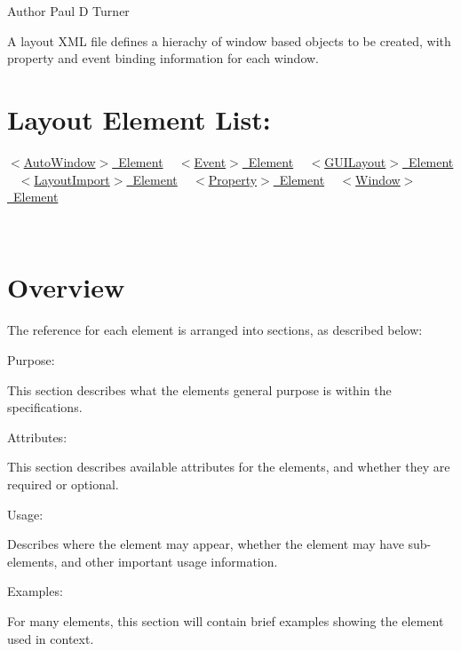 \begin{DoxyAuthor}{Author}
Paul D Turner
\end{DoxyAuthor}
A layout X\+ML file defines a hierachy of window based objects to be created, with property and event binding information for each window.\hypertarget{xml_layout_xml_layout_contents}{}\section{Layout Element List\+:}\label{xml_layout_xml_layout_contents}
\mbox{\hyperlink{xml_layout_xml_layout_autowindow}{$<$\+Auto\+Window$>$ Element}} ~\newline
 \mbox{\hyperlink{xml_layout_xml_layout_event}{$<$\+Event$>$ Element}} ~\newline
 \mbox{\hyperlink{xml_layout_xml_layout_guilayout}{$<$\+G\+U\+I\+Layout$>$ Element}} ~\newline
 \mbox{\hyperlink{xml_layout_xml_layout_layoutimport}{$<$\+Layout\+Import$>$ Element}} ~\newline
 \mbox{\hyperlink{xml_layout_xml_layout_property}{$<$\+Property$>$ Element}} ~\newline
 \mbox{\hyperlink{xml_layout_xml_layout_window}{$<$\+Window$>$ Element}} ~\newline


~\newline
 \hypertarget{xml_layout_xml_layout_overview}{}\section{Overview}\label{xml_layout_xml_layout_overview}
The reference for each element is arranged into sections, as described below\+:
\begin{DoxyItemize}
\item Purpose\+:
\begin{DoxyItemize}
\item This section describes what the elements general purpose is within the specifications.
\end{DoxyItemize}
\item Attributes\+:
\begin{DoxyItemize}
\item This section describes available attributes for the elements, and whether they are required or optional.
\end{DoxyItemize}
\item Usage\+:
\begin{DoxyItemize}
\item Describes where the element may appear, whether the element may have sub-\/elements, and other important usage information.
\end{DoxyItemize}
\item Examples\+:
\begin{DoxyItemize}
\item For many elements, this section will contain brief examples showing the element used in context.
\end{DoxyItemize}
\end{DoxyItemize}

